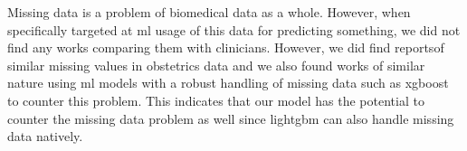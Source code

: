 Missing data is a problem of biomedical data as a whole. However, when specifically targeted at \ac{ml} usage of this data for predicting something, we did not find any works comparing them with clinicians. However, we did find reportsof similar missing values in obstetrics data \cite{venkateshMachineLearningStatistical2020} and we also found works of similar nature using \ac{ml} models with a robust handling of missing data such as \ac{xgboost} \cite{bitarMachineLearningAlgorithm2023} to counter this problem. This indicates that our model has the potential to counter the missing data problem as well since \ac{lightgbm} can also handle missing data natively.
